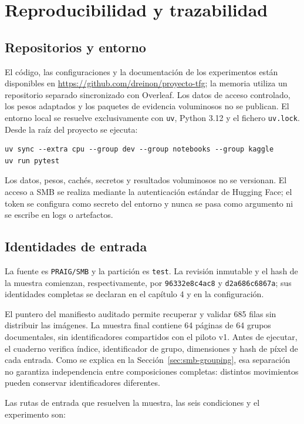 \chapter{Reproducibilidad y trazabilidad}

\section{Repositorios y entorno}
El código, las configuraciones y la documentación de los experimentos están disponibles en
\url{https://github.com/dreinon/proyecto-tfg}; la memoria utiliza un repositorio separado
sincronizado con Overleaf. Los datos de acceso controlado, los pesos adaptados y los paquetes de
evidencia voluminosos no se publican. El entorno local se resuelve exclusivamente con
\texttt{uv}, Python 3.12 y el fichero \texttt{uv.lock}. Desde la raíz del proyecto se ejecuta:

\begin{verbatim}
uv sync --extra cpu --group dev --group notebooks --group kaggle
uv run pytest
\end{verbatim}

Los datos, pesos, cachés, secretos y resultados voluminosos no se versionan. El acceso a SMB se
realiza mediante la autenticación estándar de Hugging Face; el token se configura como secreto del
entorno y nunca se pasa como argumento ni se escribe en logs o artefactos.

\section{Identidades de entrada}
La fuente es \texttt{PRAIG/SMB} y la partición es \texttt{test}. La revisión inmutable y el hash de
la muestra comienzan, respectivamente, por \texttt{96332e8c4ac8} y \texttt{d2a686c6867a}; sus
identidades completas se declaran en el capítulo 4 y en la configuración.

El puntero del manifiesto auditado permite recuperar y validar 685 filas sin distribuir las
imágenes. La muestra final contiene 64 páginas de 64 grupos documentales, sin identificadores
compartidos con el piloto v1. Antes de ejecutar, el cuaderno verifica índice, identificador de
grupo, dimensiones y hash de píxel de cada entrada. Como se explica en la
Sección~\ref{sec:smb-grouping}, esa separación no garantiza independencia entre composiciones
completas: distintos movimientos pueden conservar identificadores diferentes.

Las rutas de entrada que resuelven la muestra, las seis condiciones y el experimento son:

